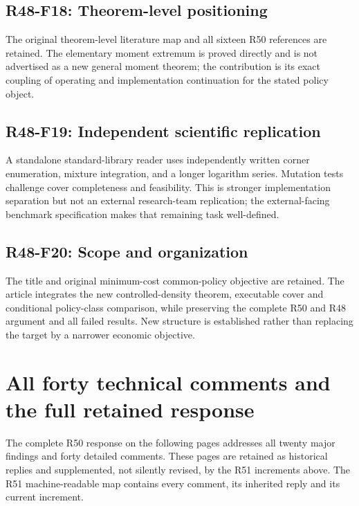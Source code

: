 \subsection{R48-F18: Theorem-level positioning}

The original theorem-level literature map and all sixteen R50 references are retained. The elementary moment extremum is proved directly and is not advertised as a new general moment theorem; the contribution is its exact coupling of operating and implementation continuation for the stated policy object.

\subsection{R48-F19: Independent scientific replication}

A standalone standard-library reader uses independently written corner enumeration, mixture integration, and a longer logarithm series. Mutation tests challenge cover completeness and feasibility. This is stronger implementation separation but not an external research-team replication; the external-facing benchmark specification makes that remaining task well-defined.

\subsection{R48-F20: Scope and organization}

The title and original minimum-cost common-policy objective are retained. The article integrates the new controlled-density theorem, executable cover and conditional policy-class comparison, while preserving the complete R50 and R48 argument and all failed results. New structure is established rather than replacing the target by a narrower economic objective.

\section{All forty technical comments and the full retained response}

The complete R50 response on the following pages addresses all twenty major findings and forty detailed comments. These pages are retained as historical replies and supplemented, not silently revised, by the R51 increments above. The R51 machine-readable map contains every comment, its inherited reply and its current increment.




